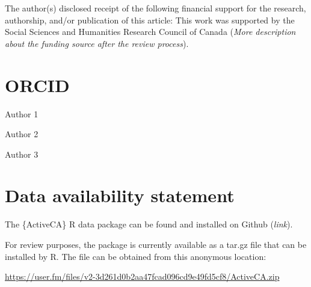 \documentclass[Royal,times,sageh]{sagej}
\begin{document}
The author(s) disclosed receipt of the following financial support for
the research, authorship, and/or publication of this article: This work
was supported by the Social Sciences and Humanities Research Council of
Canada (\emph{More description about the funding source after the review
process}).

\section{ORCID}\label{orcid}

Author 1

Author 2

Author 3

\section{Data availability statement}\label{data-availability-statement}

The \{ActiveCA\} R data package can be found and installed on Github
(\emph{link}).

For review purposes, the package is currently available as a tar.gz file
that can be installed by R. The file can be obtained from this anonymous
location:

\url{https://user.fm/files/v2-3d261d0b2aa47fcad096cd9e49fd5cf8/ActiveCA.zip}



\end{document}
